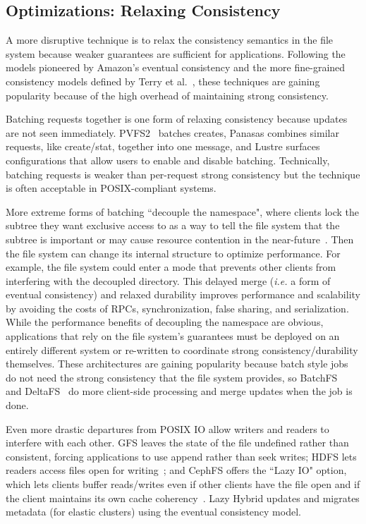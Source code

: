 \subsection{Optimizations: Relaxing Consistency}

A more disruptive technique is to relax the consistency semantics in the file
system because weaker guarantees are sufficient for applications. Following the
models pioneered by Amazon's eventual consistency and the more fine-grained
consistency models defined by Terry et al.~\cite{baseball}, these techniques
are gaining popularity because of the high overhead of maintaining strong
consistency.

Batching requests together is one form of relaxing consistency because updates
are not seen immediately. PVFS2~\cite{PVFS2} batches creates, Panasas combines
similar requests, like create/stat, together into one message, and Lustre
surfaces configurations that allow users to enable and disable batching.
Technically, batching requests is weaker than per-request strong consistency
but the technique is often acceptable in POSIX-compliant systems.

More extreme forms of batching ``decouple the namespace", where clients lock
the subtree they want exclusive access to as a way to tell the file system that
the subtree is important or may cause resource contention in the
near-future~\cite{grider:pdsw2015-marfs, zheng:pdsw2015-deltafs,
zheng:pdsw2014-batchfs, ren:sc2014-indexfs, bent:slides-twotiers}. Then the
file system can change its internal structure to optimize performance. For
example, the file system could enter a mode that prevents other clients from
interfering with the decoupled directory.  This delayed merge ({\it i.e.} a
form of eventual consistency) and relaxed durability improves performance and
scalability by avoiding the costs of RPCs, synchronization, false sharing, and
serialization.  While the performance benefits of decoupling the namespace are
obvious, applications that rely on the file system's guarantees must be
deployed on an entirely different system or re-written to coordinate strong
consistency/durability themselves.  These architectures are gaining popularity
because batch style jobs do not need the strong consistency that the file
system provides, so BatchFS~\cite{zheng:pdsw2014-batchfs} and
DeltaFS~\cite{zheng:pdsw2015-deltafs} do more client-side processing and merge
updates when the job is done.  

Even more drastic departures from POSIX IO allow writers and readers to
interfere with each other. GFS leaves the state of the file undefined rather
than consistent, forcing applications to use append rather than seek writes;
HDFS lets readers access files open for
writing~\cite{hakimzadeh:dais14-hdfs-consistency}; and CephFS offers the ``Lazy
IO" option, which lets clients buffer reads/writes even if other clients have
the file open and if the client maintains its own cache
coherency~\cite{docs:cephcaps}.  Lazy Hybrid updates and migrates metadata (for
elastic clusters) using the eventual consistency model.

